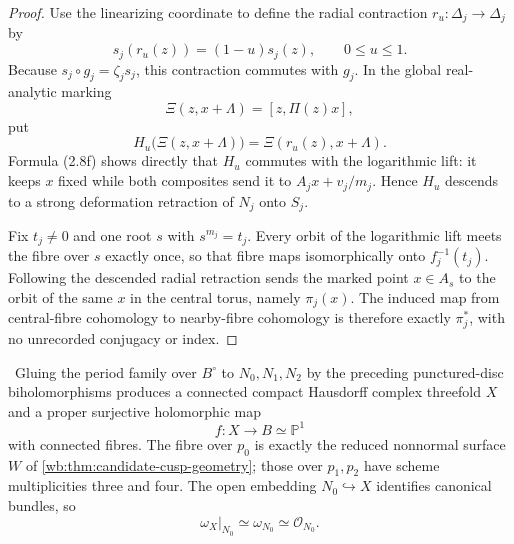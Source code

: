 \begin{proof}
Use the linearizing coordinate to define the radial contraction
\(r_u:\Delta_j\to\Delta_j\) by
\[
 s_j(r_u(z))=(1-u)s_j(z),\qquad 0\le u\le1.
\]
Because \(s_j\circ g_j=\zeta_js_j\), this contraction commutes with
\(g_j\).  In the global real-analytic marking
\[
 \Xi(z,x+\Lambda)=[z,\Pi(z)x],
\]
put
\[
 H_u\bigl(\Xi(z,x+\Lambda)\bigr)
   =\Xi(r_u(z),x+\Lambda).
\]
Formula (2.8f) shows directly that \(H_u\) commutes with the logarithmic
lift: it keeps \(x\) fixed while both composites send it to
\(A_jx+v_j/m_j\).  Hence \(H_u\) descends to a strong deformation
retraction of \(N_j\) onto \(S_j\).

Fix \(t_j\ne0\) and one root \(s\) with \(s^{m_j}=t_j\).  Every orbit of
the logarithmic lift meets the fibre over \(s\) exactly once, so that fibre
maps isomorphically onto \(f_j^{-1}(t_j)\).  Following the descended radial
retraction sends the marked point \(x\in A_s\) to the orbit of the same
\(x\) in the central torus, namely \(\pi_j(x)\).  The induced map from
central-fibre cohomology to nearby-fibre cohomology is therefore exactly
\(\pi_j^*\), with no unrecorded conjugacy or index.
\end{proof}

\begin{theorem}
\label{wb:thm:candidate-global-geometry}
\ Gluing the period family over \(B^\circ\) to
\(N_0,N_1,N_2\) by the preceding punctured-disc biholomorphisms produces a
connected compact Hausdorff complex threefold \(X\) and a proper surjective
holomorphic map
\[
 f:X\longrightarrow B\simeq\mathbb P^1
\]
with connected fibres.  The fibre over \(p_0\) is exactly the reduced
nonnormal surface \(W\) of \cref{wb:thm:candidate-cusp-geometry}; those over
\(p_1,p_2\) have scheme multiplicities three and four.  The open embedding
\(N_0\hookrightarrow X\) identifies canonical bundles, so
\begin{equation}
 \omega_X|_{N_0}\simeq\omega_{N_0}\simeq\mathcal O_{N_0}.
\label{wb:eq:candidate-global-canonical-on-cusp}
\end{equation}
\end{theorem}

